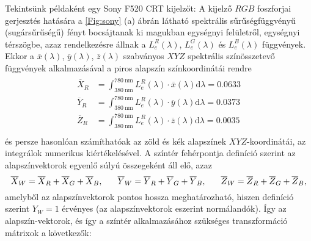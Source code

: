 Tekintsünk példaként egy Sony F520 CRT kijelzőt: 
A kijelző $RGB$ foszforjai gerjesztés hatására a \ref{Fig:sony} (a) ábrán látható spektrális sűrűségfüggvényű (sugársűrűségű) fényt bocsájtanak ki magukban egységnyi felületről, egységnyi térszögbe, azaz rendelkezésre állnak a $L_{e}^R(\lambda)$, $L_{e}^G(\lambda)$ és $L_{e}^B(\lambda)$ függvények.
Ekkor a $\overline{x}(\lambda)$, $\overline{y}(\lambda)$, $\overline{z}(\lambda)$ szabványos $XYZ$ spektrális színösszetevő függvények alkalmazásával a piros alapszín színkoordinátái rendre
\begin{align}
\begin{split}
\overline{X}_R &= \int_{380~\mathrm{nm}}^{780~\mathrm{nm}} L_{e}^R(\lambda) \cdot \overline{x}(\lambda) \mathrm{d} \lambda = 0.0633 \\
\overline{Y}_R &= \int_{380~\mathrm{nm}}^{780~\mathrm{nm}} L_{e}^R(\lambda) \cdot \overline{y}(\lambda) \mathrm{d} \lambda = 0.0373\\
\overline{Z}_R &= \int_{380~\mathrm{nm}}^{780~\mathrm{nm}} L_{e}^R(\lambda) \cdot \overline{z}(\lambda) \mathrm{d} \lambda  = 0.0035 \\
\end{split}
\end{align}
és persze hasonlóan számíthatóak az zöld és kék alapszínek $XYZ$-koordinátái, az integrálok numerikus kiértékelésével.
A színtér fehérpontja definíció szerint az alapszínvektorok egyenlő súlyú összegeként áll elő, azaz
\begin{equation}
\overline{X}_W = \overline{X}_R + \overline{X}_G + \overline{X}_B, \hspace{6mm} 
\overline{Y}_W = \overline{Y}_R + \overline{Y}_G + \overline{Y}_B, \hspace{6mm} 
\overline{Z}_W = \overline{Z}_R + \overline{Z}_G + \overline{Z}_B,
\end{equation}
amelyből az alapszínvektorok pontos hossza meghatározható, hiszen definíció szerint $Y_W = 1$ érvényes (az alapszínvektorok eszerint normálandók).
Így az alapszín-vektorok, és így a színtér alkalmazásához szükséges transzformáció mátrixok a következők:
